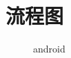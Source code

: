 {\centering
\section{流程图}}
\begin{figure}[h]
    \centering
   
    \caption{android}
    \label{tikzpicture:process}
\end{figure}
